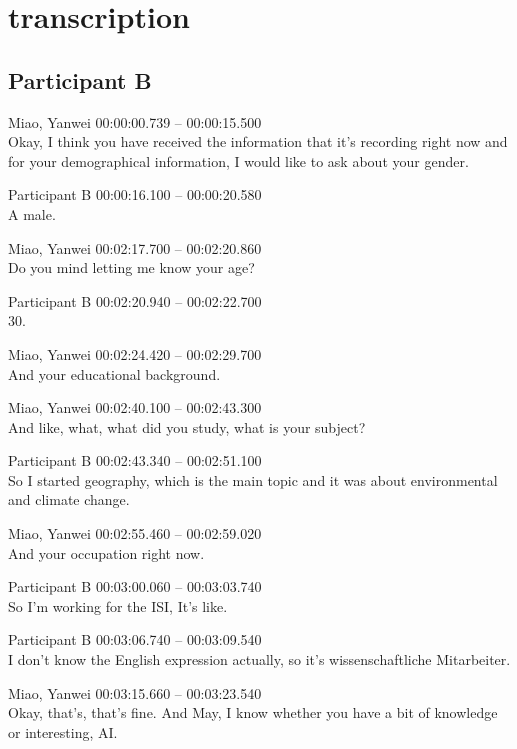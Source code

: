 \clearpage %

\chapter{transcription}
\label{appendix:transcription}

\section*{Participant B}

{\parindent0pt
\tiny
\singlespacing
Miao, Yanwei 00:00:00.739 -- 00:00:15.500 \\
Okay, I think you have received the information that it's recording right now and for your demographical information, I would like to ask about your gender.

Participant B 00:00:16.100 -- 00:00:20.580 \\
A male.

Miao, Yanwei 00:02:17.700 -- 00:02:20.860 \\
Do you mind letting me know your age?

Participant B 00:02:20.940 -- 00:02:22.700 \\
30.

Miao, Yanwei 00:02:24.420 -- 00:02:29.700 \\
And your educational background.

Miao, Yanwei 00:02:40.100 -- 00:02:43.300 \\
And like, what, what did you study, what is your subject?

Participant B 00:02:43.340 -- 00:02:51.100 \\
So I started geography, which is the main topic and it was about environmental and climate change.

Miao, Yanwei 00:02:55.460 -- 00:02:59.020 \\
And your occupation right now.

Participant B 00:03:00.060 -- 00:03:03.740 \\
So I'm working for the ISI, It's like.

Participant B 00:03:06.740 -- 00:03:09.540 \\
I don't know the English expression actually, so it's wissenschaftliche Mitarbeiter.

Miao, Yanwei 00:03:15.660 -- 00:03:23.540 \\
Okay, that's, that's fine. And May, I know whether you have a bit of knowledge or interesting, AI.

}
